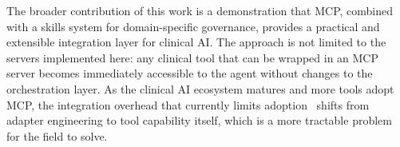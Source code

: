 \documentclass[conference]{IEEEtran}
\begin{document}
The broader contribution of this work is a demonstration that MCP, combined with a skills system for domain-specific governance, provides a practical and extensible integration layer for clinical AI. The approach is not limited to the servers implemented here: any clinical tool that can be wrapped in an MCP server becomes immediately accessible to the agent without changes to the orchestration layer. As the clinical AI ecosystem matures and more tools adopt MCP, the integration overhead that currently limits adoption~\cite{collaco2026scoping} shifts from adapter engineering to tool capability itself, which is a more tractable problem for the field to solve.



\end{document}

